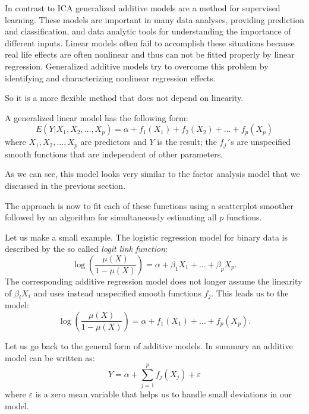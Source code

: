 \documentclass[12pt, a4paper]{article}
\numberwithin{equation}{section}
\numberwithin{figure}{section}
\numberwithin{table}{section}
\begin{document}
	In contrast to ICA generalized additive models are a method for supervised learning. %
	These models are important in many data analyses, providing prediction and classification, and data analytic tools for understanding the importance of different inputs. %
	Linear models often fail to accomplish these situations because real life effects are often nonlinear and thus can not be fitted properly by linear regression.
	Generalized additive models try to overcome this problem by identifying and characterizing nonlinear regression effects.
	
	So it is a more flexible method that does not depend on linearity.
	
	A generalized linear model has the following form:
	\begin{equation}
	E(Y \vert X_1,X_2,\dots,X_p)=\alpha + f_1(X_1)+f_2(X_2)+\dots+f_p(X_p)
	\end{equation}
	where $X_1,X_2,\dots,X_p$ are predictors and $Y$ is the result; the $f_j$´s are unspecified smooth functions that are independent of other parameters.
	
	As we can see, this model looks very similar to the factor analysis model that we discussed in the previous section.
	
	The approach is now to fit each of these functions using a scatterplot smoother followed by an algorithm for simultaneously estimating all $p$ functions. %
	
	
	Let us make a small example. %
	The logistic regression model for binary data is described by the so called \textit{logit link function}:
	\begin{equation}
	\log \left(\frac{\mu(X)}{1-\mu(X)}\right)=\alpha + \beta_1X_1+\dots+\beta_pX_p.
	\end{equation}
	The corresponding additive regression model does not longer assume the linearity of \mbox{$\beta_i X_i$} and uses instead unspecified smooth functions \mbox{$f_j$}.
	This leads us to the model:
	\begin{equation}
	\log \left(\frac{\mu(X)}{1-\mu(X)}\right)=\alpha+f_1(X_1)+\dots+f_p(X_p).
	\end{equation}
	
	Let us go back to the general form of additive models. In summary an additive model can be written as:
	\begin{equation}
	Y=\alpha + \sum_{j=1}^{p}f_j(X_j)+\varepsilon
	\end{equation}
	where \mbox{$\varepsilon$} is a zero mean variable that helps us to handle small deviations in our model.
	
\end{document}
